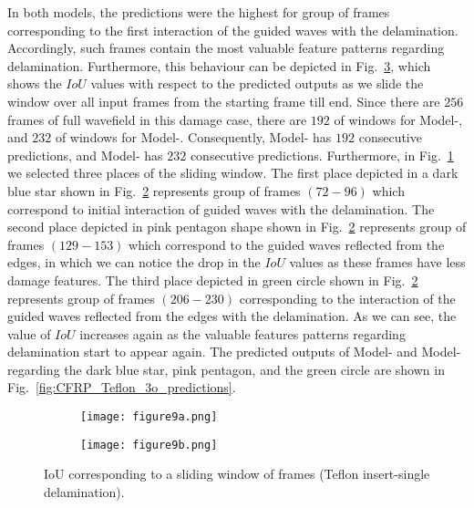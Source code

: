 In both models, the predictions were the highest for group of frames corresponding to the first interaction of the guided waves with the delamination.
Accordingly, such frames contain the most valuable feature patterns regarding delamination. 
Furthermore, this behaviour can be depicted in Fig.~\ref{fig:CFRP_Teflon_3o_IoU_centre_window}, which shows the \(IoU\) values with respect to the predicted outputs as we slide the window over all input frames from the starting frame till end.
Since there are \(256\) frames of full wavefield in this damage case, there are \(192\) of windows for Model-, and \(232\) of windows for Model-.
Consequently, Model- has \(192\) consecutive predictions, and Model- has \(232\) consecutive predictions.
Furthermore, in Fig.~\ref{fig:CFRP_Teflon_3o_IoU_} we selected three places of the sliding window. 
The first place depicted in a dark blue star shown in Fig.~\ref{fig:CFRP_teflon_3o_shapes_} represents group of frames \((72-96)\) which correspond to initial interaction of guided waves with the delamination.
The second place depicted in pink pentagon shape shown in Fig.~\ref{fig:CFRP_teflon_3o_shapes_} represents group of frames \((129-153)\) which correspond to the guided waves reflected from the edges, in which we can notice the drop in the \(IoU\) values as these frames have less damage features.
The third place depicted in green circle shown in Fig.~\ref{fig:CFRP_teflon_3o_shapes_} represents group of frames \((206-230)\) corresponding to the interaction of the guided waves reflected from the edges with the delamination.
As we can see, the value of \(IoU\) increases again as the valuable features patterns regarding delamination start to appear again.
The predicted outputs of Model- and Model- regarding the dark blue star, pink pentagon, and the green circle are shown in Fig.~\ref{fig:CFRP_Teflon_3o_predictions}.
\begin{figure} [!h]
	\begin{subfigure}[b]{1\textwidth}
		\centering
		\texttt{[image: figure9a.png]}
		\caption{}
		\label{fig:CFRP_Teflon_3o_IoU_}
	\end{subfigure}
	\par\medskip
	\begin{subfigure}[b]{1\textwidth}
		\centering
		\texttt{[image: figure9b.png]}
		\caption{} 
		\label{fig:CFRP_teflon_3o_shapes_}
	\end{subfigure}
	\caption{IoU corresponding to a sliding window of frames (Teflon insert-single delamination).}
	\label{fig:CFRP_Teflon_3o_IoU_centre_window}
\end{figure} 
